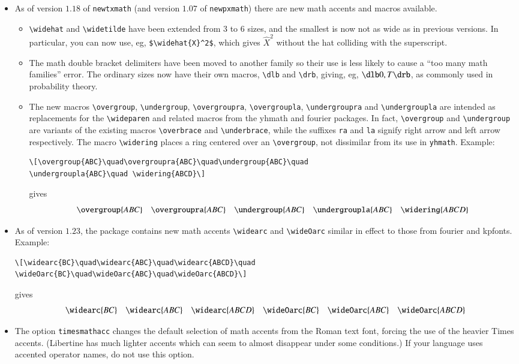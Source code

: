 \documentclass[11pt]{article}
\begin{document}
\begin{itemize}
\item As of version $1.18$ of {\tt newtxmath} (and version $1.07$ of {\tt newpxmath}) there are new math accents and macros available.
\begin{itemize}
\item
\verb|\widehat| and \verb|\widetilde| have been extended from $3$ to $6$ sizes, and the smallest is now not as wide as in previous versions. In particular, you can now use, eg, \verb|$\widehat{X}^2$|, which gives $\widehat{X}^2$ without the hat colliding with the superscript.
\item The math double bracket delimiters have been moved to another family so their use is less likely to cause a ``too many math families'' error. The ordinary sizes now have their own macros, \verb|\dlb| and \verb|\drb|, giving, eg, $\dlb 0,T\drb$, as commonly used in probability theory.
\item The new macros \verb|\overgroup|, \verb|\undergroup|, \verb|\overgroupra|, \verb|\overgroupla|, \verb|\undergroupra| and \verb|\undergroupla| are intended as replacements for the \verb|\wideparen| and related macros from the \textsf{yhmath} and \textsf{fourier} packages. In fact, \verb|\overgroup| and \verb|\undergroup| are variants of the existing macros \verb|\overbrace| and \verb|\underbrace|, while the suffixes {\tt ra} and {\tt la} signify right arrow and left arrow respectively. The macro \verb|\widering| places a ring centered over an \verb|\overgroup|, not dissimilar from its use in {\tt yhmath}. Example:
\begin{verbatim}
\[\overgroup{ABC}\quad\overgroupra{ABC}\quad\undergroup{ABC}\quad
\undergroupla{ABC}\quad \widering{ABCD}\] 
\end{verbatim}
gives
\[\overgroup{ABC}\quad\overgroupra{ABC}\quad\undergroup{ABC}\quad\undergroupla{ABC}\quad\widering{ABCD}\] 
\end{itemize}
\item As of version $1.23$, the package contains new math accents \verb|\widearc| and \verb|\wideOarc| similar in effect to those from \textsf{fourier} and \textsf{kpfonts}. Example: 
\begin{verbatim}
\[\widearc{BC}\quad\widearc{ABC}\quad\widearc{ABCD}\quad
\wideOarc{BC}\quad\wideOarc{ABC}\quad\wideOarc{ABCD}\]
\end{verbatim}
gives
\[\widearc{BC}\quad\widearc{ABC}\quad\widearc{ABCD}\quad
\wideOarc{BC}\quad\wideOarc{ABC}\quad\wideOarc{ABCD}\]
\item The option {\tt timesmathacc} changes the default selection of math accents from the Roman text font, forcing the use of the heavier Times accents. (Libertine has much lighter accents which can seem to almost disappear under some conditions.) If your language uses accented operator names, do not use this option.
\end{itemize}
\bigskip
\end{document}
